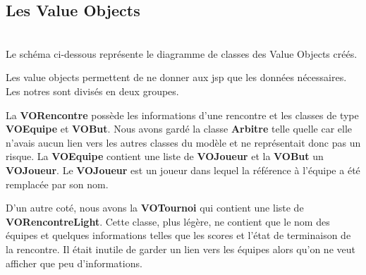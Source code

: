 \documentclass[10pt]{report}
\begin{document}
\newpage
\subsection{Les Value Objects}
~\\
Le schéma ci-dessous représente le diagramme de classes des Value Objects créés. \\
	\begin{figure}[here]
	      \begin{center}
	      \end{center}
	\end{figure}

Les value objects permettent de ne donner aux jsp que les données nécessaires.
Les notres sont divisés en deux groupes.

La \textbf{VORencontre} possède les informations d'une rencontre et les classes de type \textbf{VOEquipe} et \textbf{VOBut}.
Nous avons gardé la classe \textbf{Arbitre} telle quelle car elle n'avais aucun lien vers les autres classes du modèle et ne représentait donc pas un risque.
La \textbf{VOEquipe} contient une liste de \textbf{VOJoueur} et la \textbf{VOBut} un \textbf{VOJoueur}.
Le \textbf{VOJoueur} est un joueur dans lequel la référence à l'équipe a été remplacée par son nom.

D'un autre coté, nous avons la \textbf{VOTournoi} qui contient une liste de \textbf{VORencontreLight}.
Cette classe, plus légère, ne contient que le nom des équipes et quelques informations telles que les scores et l'état de terminaison de la rencontre.
Il était inutile de garder un lien vers les équipes alors qu'on ne veut afficher que peu d'informations.

\newpage
\end{document}
